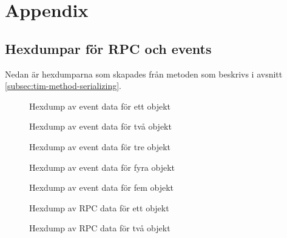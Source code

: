 \section{Appendix}
\label{sec:tim-appendix}

\subsection{Hexdumpar för RPC och events}
\label{subsec:tim-hexdumps}
Nedan är hexdumparna som skapades från metoden som beskrivs i avsnitt \ref{subsec:tim-method-serializing}.

\begin{figure}[H]
    \scriptsize
    \center
    
    \caption{Hexdump av event data för ett objekt}
    \label{fig:tim-eventdata1}
\end{figure}

\begin{figure}[H]
    \scriptsize
    \center
    
    \caption{Hexdump av event data för två objekt}
    \label{fig:tim-eventdata2}
\end{figure}

\begin{figure}[H]
    \scriptsize
    \center
    
    \caption{Hexdump av event data för tre objekt}
    \label{fig:tim-eventdata3}
\end{figure}

\begin{figure}[H]
    \scriptsize
    \center
    
    \caption{Hexdump av event data för fyra objekt}
    \label{fig:tim-eventdata4}
\end{figure}

\begin{figure}[H]
    \scriptsize
    \center
    
    \caption{Hexdump av event data för fem objekt}
    \label{fig:tim-eventdata5}
\end{figure}

\begin{figure}[H]
    \scriptsize
    \center
    
    \caption{Hexdump av RPC data för ett objekt}
    \label{fig:tim-rpcdata1}
\end{figure}

\begin{figure}[H]
    \scriptsize
    \center
    
    \caption{Hexdump av RPC data för två objekt}
    \label{fig:tim-rpcdata2}
\end{figure}

